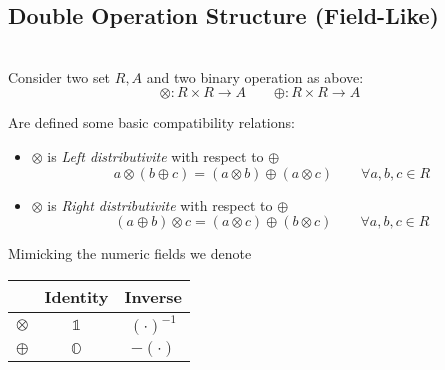 \documentclass[a4paper,12pt]{scrartcl}    %
\newcommand{\OpA}{\otimes}
\newcommand{\OpB}{\oplus}
\begin{document}
\begin{landscape}
		



 


\newpage
	\begin{minipage}[c][\textheight]{0.30 \linewidth}
	    \section*{Double Operation Structure (Field-Like)}
	    \mbox{}\\
		Consider two set $R, A$ and two binary operation as above:
		\begin{displaymath}
				\OpA : R \times R \rightarrow A \qquad 	\OpB : R \times R \rightarrow A
		\end{displaymath}
		
		Are defined some basic compatibility relations:
		\begin{itemize}
		\item $\OpA$ is \emph{Left distributivite} with respect to $\OpB$
			\begin{equation}\label{LeftDistributivity}
				a \OpA ( b \OpB c) = (a \OpA b) \OpB (a \OpA c) \qquad \forall a,b,c \in R
			\end{equation}
		\item  $\OpA$ is \emph{Right distributivite} with respect to $\OpB$
			\begin{equation}\label{RightDistributivity}
				( a \OpB b)\OpA c = (a \OpA c) \OpB (b \OpA c) \qquad \forall a,b,c \in R	
			\end{equation}
		\end{itemize}
		\begin{notationfix}
			Mimicking the numeric fields we denote
			\begin{tabular}{|c|c c|}
				\hline 
					& Identity & Inverse \\
				\hline
				$\OpA$ & $\mathbb{1}$ & $(\cdot)^{-1}$\\
				$\OpB$ & $\mathbb{O}$ & $-(\cdot)$\\
				\hline
			\end{tabular}
		\end{notationfix}
		

\end{minipage}
\end{landscape}
\end{document}
